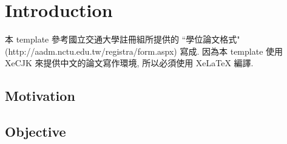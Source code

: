 \chapter{Introduction}
\label{chapter:intro}

本 template 參考國立交通大學註冊組所提供的 ``學位論文格式" (http://aadm.nctu.edu.tw/registra/form.aspx) 寫成.
因為本 template 使用 XeCJK 來提供中文的論文寫作環境, 所以必須使用 XeLaTeX 編譯.

\section{Motivation}

\section{Objective}